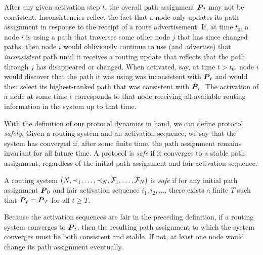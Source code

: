 After any given activation step $t$, the overall path
assignment $\boldsymbol{P}_t$ may not be consistent.  Inconsistencies reflect the
fact that a node only updates its path assignment in response to the
receipt of a route advertisement.  If, at time $t_0$, a node $i$ is
using a path that traverses some other node $j$ that has since changed
paths, then node $i$ would obliviously continue to use (and advertise)
that {\em inconsistent} path until it receives a routing update that
reflects that the path through $j$ has disappeared or changed.  
When activated, say, at time $t > t_0$, node $i$ would discover that the
path it was using was 
inconsistent with $\boldsymbol{P}_t$ and would then select its
highest-ranked path that was consistent with $\boldsymbol{P}_t$.  The activation
of a node at some time $t$ corresponds to that node receiving all
available routing information in the system up to that time.

With the definition of our protocol dynamics in hand, we can define
protocol {\em safety}.  Given a routing system and an activation
sequence, we say that the system has converged if, after some finite
time, the path assignment remains invariant for all future time.  A
protocol is {\em safe} if it converges to a stable path assignment,
regardless of the initial path assignment and fair activation sequence.

\begin{defn}[Safety]
\label{def:safety}
A routing system $(N, \prec_1, \ldots, \prec_N, \mathcal{F}_1,
\ldots, \mathcal{F}_N)$ is {\em safe} if for any initial path
assignment $\boldsymbol{P}_0$ and fair activation sequence $i_1, i_2, \ldots$,
there exists a finite $T$ such that $\boldsymbol{P}_t = \boldsymbol{P}_T$ for all $t \geq
T$.  
\end{defn} 
 
Because the activation sequences are fair in the preceding
definition, if a routing system converges to $\boldsymbol{P}_t$, then the
resulting path assignment to which the system converges must be both
consistent and stable.  If not, at least one node would change its path
assignment eventually.  

